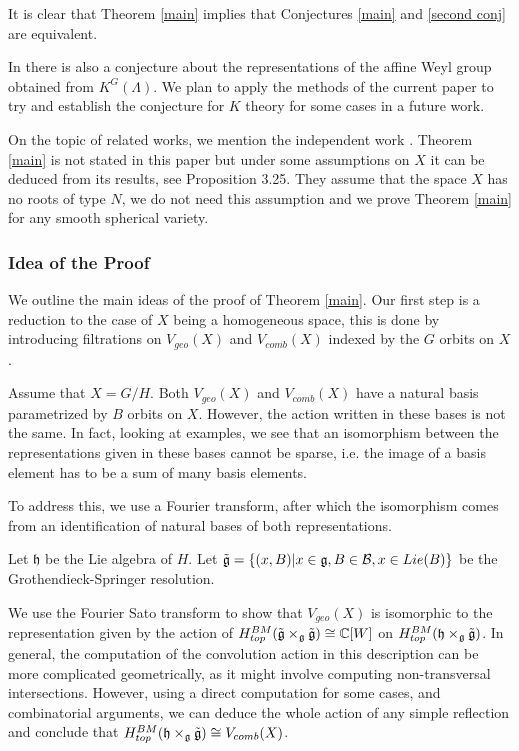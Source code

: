 \documentclass[12pt]{article}
\newcommand{\B}{\mathcal{B}}
\newcommand{\C}{\mathbb{C}}
\theoremstyle{plain}
\theoremstyle{definition}
\begin{document}
It is clear that Theorem \ref{main} implies that Conjectures \ref{main} and \ref{second conj} are equivalent. 

In \cite{shtotland2026relativekazhdanlusztigisomorphism} there is also a conjecture about the representations of the affine Weyl group obtained from $K^{G}(\Lambda)$. We plan to apply the methods of the current paper to try and establish the conjecture for $K$ theory for some cases in a future work.

On the topic of related works, we mention the independent work 
\cite{ma2025thetacorrespondencespringercorrespondence}. Theorem \ref{main} is not stated in this paper but under some assumptions on $X$ it can be deduced from its results, see Proposition 3.25. They assume that the space $X$ has no roots of type $N$, we do not need this assumption and we prove Theorem \ref{main} for any smooth spherical variety.  


\subsubsection*{Idea of the Proof}
    We outline the main ideas of the proof of Theorem \ref{main}. Our first step is a reduction to the case of $X$ being a homogeneous space, this is done by introducing filtrations on $V_{geo}(X)$ and $V_{comb}(X)$ indexed by the $G$ orbits on $X$.


    
     Assume that $X=G/H$. Both $V_{geo}(X)$ and $V_{comb}(X)$ have a natural basis parametrized by $B$ orbits on $X$. However, the action written in these bases is not the same. In fact, looking at examples, we see that an isomorphism between the representations given in these bases cannot be sparse, i.e. the image of a basis element has to be a sum of many basis elements. 

    To address this, we use a Fourier transform, after which the isomorphism comes from an identification of natural bases of both representations.
    
    
     Let $\mathfrak{h}$ be the Lie algebra of $H$. Let $\Tilde{\mathfrak{g}}=\{(x,B)|x\in \mathfrak{g},B\in \B, x\in Lie(B)\}$ be the Grothendieck-Springer resolution.


    We use the Fourier Sato transform to show that $V_{geo}(X)$ is isomorphic to the representation given by the action of $H^{BM}_{top}(\Tilde{\mathfrak{g}}\times_{\mathfrak{g}}\Tilde{\mathfrak{g}})\cong \C[W]$ on $H^{BM}_{top}(\mathfrak{h}\times_{\mathfrak{g}}\Tilde{\mathfrak{g}})$. 
    In general, the computation of the convolution action in this description can be more complicated geometrically, as it might involve computing non-transversal intersections. However, using a direct computation for some cases, and combinatorial arguments, we can deduce the whole action of any simple reflection and conclude that $H^{BM}_{top}(\mathfrak{h}\times_{\mathfrak{g}}\Tilde{\mathfrak{g}})\cong V_{comb}(X)$.
\end{document}
